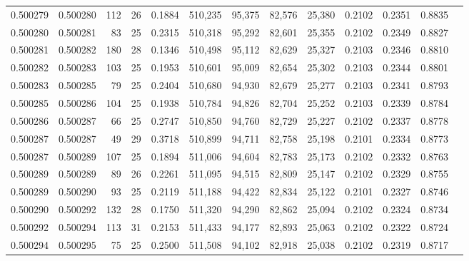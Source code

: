 \begin{tabular}{rrrrrrrrrrrrr}
0.500279 & 0.500280 & 112 &  26 &                                     0.1884 & 510,235 &  95,375 &  82,576 &  25,380 & 0.2102 & 0.2351 & 0.8835 \\
0.500280 & 0.500281 &  83 &  25 &                                     0.2315 & 510,318 &  95,292 &  82,601 &  25,355 & 0.2102 & 0.2349 & 0.8827 \\
0.500281 & 0.500282 & 180 &  28 &                                     0.1346 & 510,498 &  95,112 &  82,629 &  25,327 & 0.2103 & 0.2346 & 0.8810 \\
0.500282 & 0.500283 & 103 &  25 &                                     0.1953 & 510,601 &  95,009 &  82,654 &  25,302 & 0.2103 & 0.2344 & 0.8801 \\
0.500283 & 0.500285 &  79 &  25 &                                     0.2404 & 510,680 &  94,930 &  82,679 &  25,277 & 0.2103 & 0.2341 & 0.8793 \\
0.500285 & 0.500286 & 104 &  25 &                                     0.1938 & 510,784 &  94,826 &  82,704 &  25,252 & 0.2103 & 0.2339 & 0.8784 \\
0.500286 & 0.500287 &  66 &  25 &                                     0.2747 & 510,850 &  94,760 &  82,729 &  25,227 & 0.2102 & 0.2337 & 0.8778 \\
0.500287 & 0.500287 &  49 &  29 &                                     0.3718 & 510,899 &  94,711 &  82,758 &  25,198 & 0.2101 & 0.2334 & 0.8773 \\
0.500287 & 0.500289 & 107 &  25 &                                     0.1894 & 511,006 &  94,604 &  82,783 &  25,173 & 0.2102 & 0.2332 & 0.8763 \\
0.500289 & 0.500289 &  89 &  26 &                                     0.2261 & 511,095 &  94,515 &  82,809 &  25,147 & 0.2102 & 0.2329 & 0.8755 \\
0.500289 & 0.500290 &  93 &  25 &                                     0.2119 & 511,188 &  94,422 &  82,834 &  25,122 & 0.2101 & 0.2327 & 0.8746 \\
0.500290 & 0.500292 & 132 &  28 &                                     0.1750 & 511,320 &  94,290 &  82,862 &  25,094 & 0.2102 & 0.2324 & 0.8734 \\
0.500292 & 0.500294 & 113 &  31 &                                     0.2153 & 511,433 &  94,177 &  82,893 &  25,063 & 0.2102 & 0.2322 & 0.8724 \\
0.500294 & 0.500295 &  75 &  25 &                                     0.2500 & 511,508 &  94,102 &  82,918 &  25,038 & 0.2102 & 0.2319 & 0.8717 \\

\end{tabular}
